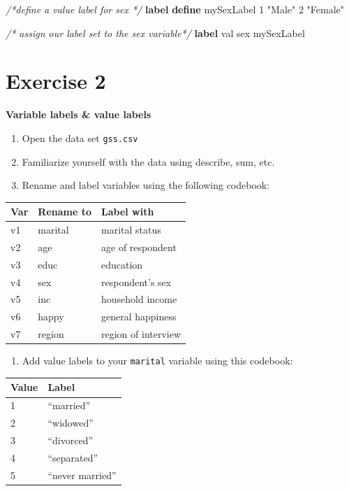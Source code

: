 \documentclass[]{book}
\newenvironment{Shaded}{\begin{snugshade}}{\end{snugshade}}
\newcommand{\CommentTok}[1]{\textcolor[rgb]{0.56,0.35,0.01}{\textit{#1}}}
\newcommand{\KeywordTok}[1]{\textcolor[rgb]{0.13,0.29,0.53}{\textbf{#1}}}
\newcommand{\NormalTok}[1]{#1}
\newcommand{\StringTok}[1]{\textcolor[rgb]{0.31,0.60,0.02}{#1}}
\providecommand{\tightlist}{%
  \setlength{\itemsep}{0pt}\setlength{\parskip}{0pt}}
\begin{document}
\begin{Shaded}
\begin{Highlighting}[]
  \CommentTok{/*define a value label for sex */}
  \KeywordTok{label} \KeywordTok{define}\NormalTok{ mySexLabel 1 }\StringTok{"Male"}\NormalTok{ 2 }\StringTok{"Female"}

  \CommentTok{/* assign our label set to the sex variable*/}
  \KeywordTok{label}\NormalTok{ val sex  mySexLabel}
\end{Highlighting}
\end{Shaded}

\hypertarget{exercise-2-4}{%
\section{Exercise 2}\label{exercise-2-4}}

\textbf{Variable labels \& value labels}

\begin{enumerate}
\def\labelenumi{\arabic{enumi}.}
\tightlist
\item
  Open the data set \texttt{gss.csv}
\item
  Familiarize yourself with the data using describe, sum, etc.
\item
  Rename and label variables using the following codebook:
\end{enumerate}

\begin{longtable}[]{@{}lll@{}}
\toprule
Var & Rename to & Label with\tabularnewline
\midrule
\endhead
v1 & marital & marital status\tabularnewline
v2 & age & age of respondent\tabularnewline
v3 & educ & education\tabularnewline
v4 & sex & respondent's sex\tabularnewline
v5 & inc & household income\tabularnewline
v6 & happy & general happiness\tabularnewline
v7 & region & region of interview\tabularnewline
\bottomrule
\end{longtable}

\begin{enumerate}
\def\labelenumi{\arabic{enumi}.}
\tightlist
\item
  Add value labels to your \texttt{marital} variable using this codebook:
\end{enumerate}

\begin{longtable}[]{@{}ll@{}}
\toprule
Value & Label\tabularnewline
\midrule
\endhead
1 & ``married''\tabularnewline
2 & ``widowed''\tabularnewline
3 & ``divorced''\tabularnewline
4 & ``separated''\tabularnewline
5 & ``never married''\tabularnewline
\bottomrule
\end{longtable}
\end{document}
